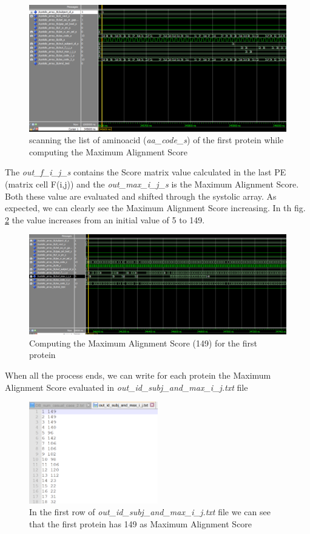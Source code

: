 \begin{figure}[h!]
	\centering
	\includegraphics[width=\textwidth]{imm/sw/evaluating_output_1.png}
	\caption{scanning the list of aminoacid (\textit{aa\_code\_s}) of the first protein while computing the Maximum Alignment Score } 
	\label{output_evaluation_1}
\end{figure}

The\textit{ out\_f\_i\_j\_s} contains the Score matrix value calculated in the last PE (matrix cell F(i,j)) and the \textit{out\_max\_i\_j\_s} is the Maximum Alignment Score. Both these value are evaluated and shifted through the systolic array. As expected,  we can clearly see the Maximum Alignment Score increasing. In th fig. \ref{149} the value increases from an initial value of 5 to 149.
\begin{figure}[h!]
	\centering
	\includegraphics[width=\textwidth]{imm/sw/149.png}
	\caption{Computing the  Maximum Alignment Score (149) for the first protein } 
	\label{149}
\end{figure}
When all the process ends, we can write for each protein the Maximum Alignment Score evaluated in \textit{out\_id\_subj\_and\_max\_i\_j.txt} file

\begin{figure}[h!]
	\centering
	\includegraphics[width=0.5\textwidth]{imm/sw/out_149.png}
	\caption{In the first row of \textit{out\_id\_subj\_and\_max\_i\_j.txt} file we can see that the first protein has 149 as Maximum Alignment Score} 
	\label{out149}
\end{figure}

